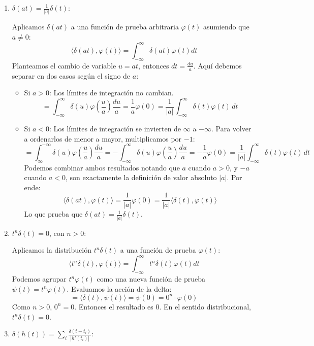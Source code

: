\documentclass[11pt,spanish]{article}
\begin{document}
\begin{enumerate}
\item $\delta(at) = \frac{1}{|a|}\delta(t)$:

Aplicamos $\delta(at)$ a una función de prueba arbitraria $\varphi(t)$ asumiendo que $a \neq 0$:
$$\langle \delta(at), \varphi(t) \rangle = \int_{-\infty}^{\infty} \delta(at)\varphi(t) dt$$
Planteamos el cambio de variable $u = at$, entonces $dt = \frac{du}{a}$. Aquí debemos separar en dos casos según el signo de $a$:
\begin{itemize}
\item Si $a > 0$: Los límites de integración no cambian.
    $$= \int_{-\infty}^{\infty} \delta(u)\varphi\left(\frac{u}{a}\right) \frac{du}{a} = \frac{1}{a} \varphi(0) = \frac{1}{|a|}\int_{-\infty}^{\infty} \delta(t) \varphi(t)\,dt$$
\item Si $a < 0$: Los límites de integración se invierten de $\infty$ a $-\infty$. Para volver a ordenarlos de menor a mayor, multiplicamos por $-1$:
    $$= \int_{\infty}^{-\infty} \delta(u)\varphi\left(\frac{u}{a}\right) \frac{du}{a} = - \int_{-\infty}^{\infty} \delta(u)\varphi\left(\frac{u}{a}\right) \frac{du}{a} = -\frac{1}{a} \varphi(0)= \frac{1}{|a|}\int_{-\infty}^{\infty} \delta(t) \varphi(t)\,dt$$
Podemos combinar ambos resultados notando que $a$ cuando $a>0$, y $-a$ cuando $a<0$, son exactamente la definición de valor absoluto $|a|$. Por ende:
$$\langle \delta(at), \varphi(t) \rangle = \frac{1}{|a|} \varphi(0) = \frac{1}{|a|} \langle \delta(t), \varphi(t) \rangle$$
Lo que prueba que $\delta(at) = \frac{1}{|a|}\delta(t)$.
\end{itemize}

\item $t^n\delta(t)=0$, con $n>0$:

Aplicamos la distribución $t^n\delta(t)$ a una función de prueba $\varphi(t)$:
$$\langle t^n\delta(t), \varphi(t) \rangle = \int_{-\infty}^{\infty} t^n \delta(t) \varphi(t) dt$$
Podemos agrupar $t^n \varphi(t)$ como una nueva función de prueba $\psi(t) = t^n \varphi(t)$. Evaluamos la acción de la delta:
$$= \langle \delta(t), \psi(t) \rangle = \psi(0) = 0^n \cdot \varphi(0)$$
Como $n > 0$, $0^n = 0$. Entonces el resultado es $0$. En el sentido distribucional, $t^n\delta(t) = 0$.

\item $\delta(h(t)) = \sum_i \frac{\delta(t-t_i)}{|h'(t_i)|}$:


\end{enumerate}
\end{document}
